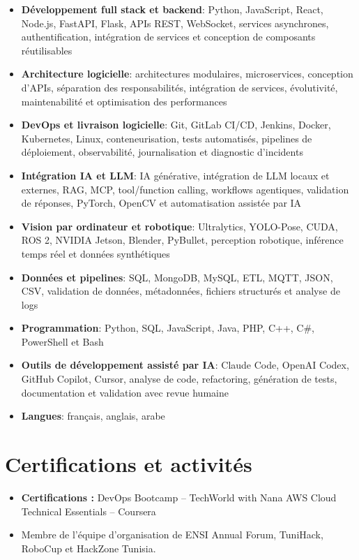 \documentclass[a4paper,10pt]{article}
\newcommand{\resumeItem}[1]{
  \item\small{{#1 \vspace{-1pt}}}
}
\newcommand{\resumeSubItem}[2]{
  \item\small{\textbf{#1}: #2 \vspace{0.3pt}}
}
\newcommand{\resumeSubHeadingListStart}{
  \begin{itemize}[
    leftmargin=0.0in,
    label={},
    itemsep=1.5pt,
    topsep=2pt,
    parsep=0pt,
    partopsep=0pt
  ]
}
\newcommand{\resumeSubHeadingListEnd}{
  \end{itemize}
}
\newcommand{\resumeItemListStart}{
  \begin{itemize}[
    leftmargin=0.18in,
    itemsep=0.8pt,
    topsep=2pt,
    parsep=0pt,
    partopsep=0pt
  ]
}
\newcommand{\resumeItemListEnd}{
  \end{itemize}\vspace{1.5pt}
}
\begin{document}
\resumeSubHeadingListStart

  \resumeSubItem{Développement full stack et backend}{
  Python, JavaScript, React, Node.js, FastAPI, Flask, APIs REST,
  WebSocket, services asynchrones, authentification, intégration de services
  et conception de composants réutilisables
  }

  \resumeSubItem{Architecture logicielle}{
  architectures modulaires, microservices, conception d'APIs,
  séparation des responsabilités, intégration de services,
  évolutivité, maintenabilité et optimisation des performances
  }

  \resumeSubItem{DevOps et livraison logicielle}{
  Git, GitLab CI/CD, Jenkins, Docker, Kubernetes, Linux,
  conteneurisation, tests automatisés, pipelines de déploiement,
  observabilité, journalisation et diagnostic d'incidents
  }

  \resumeSubItem{Intégration IA et LLM}{
  IA générative, intégration de LLM locaux et externes, RAG,
  MCP, tool/function calling, workflows agentiques, validation de réponses,
  PyTorch, OpenCV et automatisation assistée par IA
  }

  \resumeSubItem{Vision par ordinateur et robotique}{
  Ultralytics, YOLO-Pose, CUDA, ROS 2, NVIDIA Jetson,
  Blender, PyBullet, perception robotique, inférence temps réel
  et données synthétiques
  }

  \resumeSubItem{Données et pipelines}{
  SQL, MongoDB, MySQL, ETL, MQTT, JSON, CSV,
  validation de données, métadonnées, fichiers structurés
  et analyse de logs
  }

  \resumeSubItem{Programmation}{
  Python, SQL, JavaScript, Java, PHP, C++, C\#,
  PowerShell et Bash
  }

  \resumeSubItem{Outils de développement assisté par IA}{
  Claude Code, OpenAI Codex, GitHub Copilot, Cursor,
  analyse de code, refactoring, génération de tests,
  documentation et validation avec revue humaine
  }

  \resumeSubItem{Langues}{
  français, anglais, arabe
  }

\resumeSubHeadingListEnd

\vspace{-2pt}

\section{Certifications et activités}

\resumeItemListStart

  \resumeItem{
  \textbf{Certifications :} DevOps Bootcamp -- TechWorld with Nana
  \textbar{} AWS Cloud Technical Essentials -- Coursera
  }

  \resumeItem{
  Membre de l'équipe d'organisation de ENSI Annual Forum,
  TuniHack, RoboCup et HackZone Tunisia.
  }

\resumeItemListEnd
\end{document}
